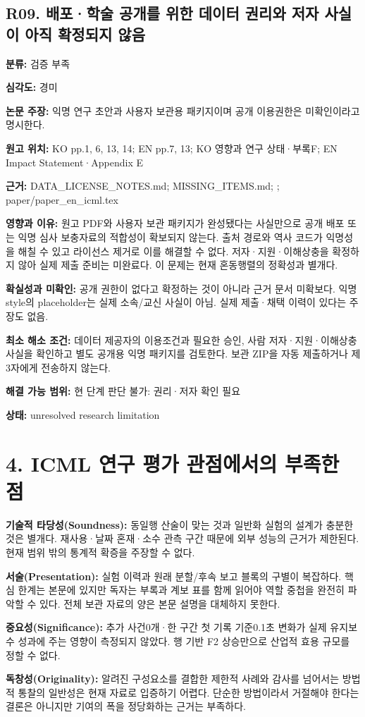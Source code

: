 \documentclass[11pt,a4paper]{article}
\begin{document}
\subsection*{R09. 배포·학술 공개를 위한 데이터 권리와 저자 사실이 아직 확정되지 않음}
\textbf{분류:} 검증 부족
\par
\textbf{심각도:} 경미
\par
\textbf{논문 주장:} 익명 연구 초안과 사용자 보관용 패키지이며 공개 이용권한은 미확인이라고 명시한다.
\par
\textbf{원고 위치:} KO pp.1, 6, 13, 14; EN pp.7, 13; KO 영향과 연구 상태·부록F; EN Impact Statement·Appendix E
\par
\textbf{근거:} DATA\_LICENSE\_NOTES.md; MISSING\_ITEMS.md; ; paper/paper\_en\_icml.tex
\par
\textbf{영향과 이유:} 원고 PDF와 사용자 보관 패키지가 완성됐다는 사실만으로 공개 배포 또는 익명 심사 보충자료의 적합성이 확보되지 않는다. 출처 경로와 역사 코드가 익명성을 해칠 수 있고 라이선스 제거로 이를 해결할 수 없다. 저자·지원·이해상충을 확정하지 않아 실제 제출 준비는 미완료다. 이 문제는 현재 혼동행렬의 정확성과 별개다.
\par
\textbf{확실성과 미확인:} 공개 권한이 없다고 확정하는 것이 아니라 근거 문서 미확보다. 익명 style의 placeholder는 실제 소속/교신 사실이 아님. 실제 제출·채택 이력이 있다는 주장도 없음.
\par
\textbf{최소 해소 조건:} 데이터 제공자의 이용조건과 필요한 승인, 사람 저자·지원·이해상충 사실을 확인하고 별도 공개용 익명 패키지를 검토한다. 보관 ZIP을 자동 제출하거나 제3자에게 전송하지 않는다.
\par
\textbf{해결 가능 범위:} 현 단계 판단 불가: 권리·저자 확인 필요
\par
\textbf{상태:} unresolved research limitation
\par
\section*{4. ICML 연구 평가 관점에서의 부족한 점}
\textbf{기술적 타당성(Soundness):} 동일행 산술이 맞는 것과 일반화 실험의 설계가 충분한 것은 별개다. 재사용·날짜 혼재·소수 관측 구간 때문에 외부 성능의 근거가 제한된다. 현재 범위 밖의 통계적 확증을 주장할 수 없다.\par
\textbf{서술(Presentation):} 실험 이력과 원래 분할/후속 보고 블록의 구별이 복잡하다. 핵심 한계는 본문에 있지만 독자는 부록과 계보 표를 함께 읽어야 역할 중첩을 완전히 파악할 수 있다. 전체 보관 자료의 양은 본문 설명을 대체하지 못한다.\par
\textbf{중요성(Significance):} 추가 사건0개·한 구간 첫 기록 기준0.1초 변화가 실제 유지보수 성과에 주는 영향이 측정되지 않았다. 행 기반 F2 상승만으로 산업적 효용 규모를 정할 수 없다.\par
\textbf{독창성(Originality):} 알려진 구성요소를 결합한 제한적 사례와 감사를 넘어서는 방법적 통찰의 일반성은 현재 자료로 입증하기 어렵다. 단순한 방법이라서 거절해야 한다는 결론은 아니지만 기여의 폭을 정당화하는 근거는 부족하다.\par
\end{document}
